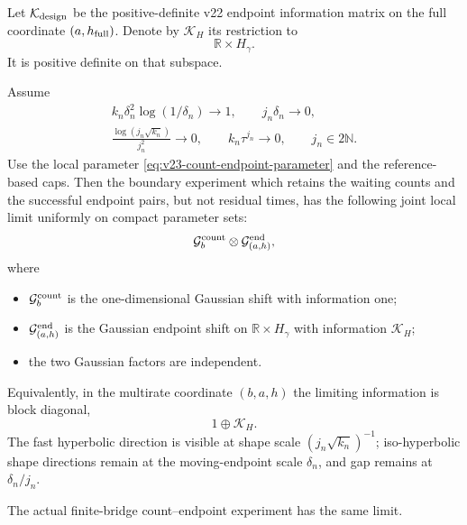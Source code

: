 Let \(\mathcal K_{\rm design}\) be the positive-definite v22 endpoint
information matrix on the full coordinate \((a,h_{\rm full})\).  Denote by
\(\mathcal K_{H}\) its restriction to
\[
                         \mathbb R\times H_\gamma.
\]
It is positive definite on that subspace.

\begin{theorem}
\label{thm:v23-count-endpoint-joint}
Assume
\begin{equation}\label{eq:v23-count-endpoint-conditions}
 \begin{gathered}
 k_n\delta_n^2\log(1/\delta_n)\to1,
 \qquad j_n\delta_n\to0,\\
 \frac{\log(j_n\sqrt{k_n})}{j_n^2}\to0,
 \qquad k_n\tau^{j_n}\to0,
 \qquad j_n\in2\mathbb N.
 \end{gathered}
\end{equation}
Use the local parameter \eqref{eq:v23-count-endpoint-parameter} and the
reference-based caps.  Then the boundary experiment which retains the waiting
counts and the successful endpoint pairs, but not residual times, has the
following joint local limit uniformly on compact parameter sets:
\begin{equation}\label{eq:v23-count-endpoint-limit}
 \mathcal G^{\rm count}_b\otimes
 \mathcal G^{\rm end}_{(a,h)},
\end{equation}
where
\begin{itemize}
\item \(\mathcal G^{\rm count}_b\) is the one-dimensional Gaussian shift
with information one;
\item \(\mathcal G^{\rm end}_{(a,h)}\) is the Gaussian endpoint shift on
\(\mathbb R\times H_\gamma\) with information
\(\mathcal K_H\);
\item the two Gaussian factors are independent.
\end{itemize}
Equivalently, in the multirate coordinate \((b,a,h)\) the limiting information
is block diagonal,
\[
                         1\oplus\mathcal K_H.
\]
The fast hyperbolic direction is visible at shape scale
\((j_n\sqrt{k_n})^{-1}\); iso-hyperbolic shape directions remain at the
moving-endpoint scale \(\delta_n\), and gap remains at
\(\delta_n/j_n\).

The actual finite-bridge count--endpoint experiment has the same limit.
\end{theorem}

